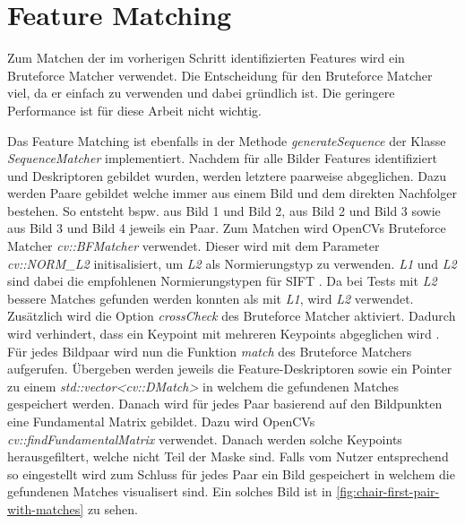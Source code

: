 \section{Feature Matching}\label{sec:implementation-feature-matching}
Zum Matchen der im vorherigen Schritt identifizierten Features wird ein Bruteforce Matcher verwendet.
Die Entscheidung für den Bruteforce Matcher viel, da er einfach zu verwenden und dabei gründlich ist.
Die geringere Performance ist für diese Arbeit nicht wichtig.

Das Feature Matching ist ebenfalls in der Methode \emph{generateSequence} der Klasse \emph{SequenceMatcher} implementiert.
Nachdem für alle Bilder Features identifiziert und Deskriptoren gebildet wurden, werden letztere paarweise abgeglichen.
Dazu werden Paare gebildet welche immer aus einem Bild und dem direkten Nachfolger bestehen.
So entsteht bspw. aus Bild 1 und Bild 2, aus Bild 2 und Bild 3 sowie aus Bild 3 und Bild 4 jeweils ein Paar.
Zum Matchen wird OpenCVs Bruteforce Matcher \emph{cv::BFMatcher}\cite{opencv_doc_bfmatcher} verwendet.
Dieser wird mit dem Parameter \emph{cv::NORM\_L2} initisalisiert, um \emph{L2} als Normierungstyp zu verwenden.
\emph{L1} und \emph{L2} sind dabei die empfohlenen Normierungstypen für SIFT \cite{opencv_doc_bfmatcher_create}.
Da bei Tests mit \emph{L2} bessere Matches gefunden werden konnten als mit \emph{L1}, wird \emph{L2} verwendet.
Zusätzlich wird die Option \emph{crossCheck} des Bruteforce Matcher aktiviert.
Dadurch wird verhindert, dass ein Keypoint mit mehreren Keypoints abgeglichen wird \cite{opencv_doc_bfmatcher_create}.
Für jedes Bildpaar wird nun die Funktion \emph{match}\cite{opencv_doc_match} des Bruteforce Matchers aufgerufen.
Übergeben werden jeweils die Feature-Deskriptoren sowie ein Pointer zu einem \emph{std::vector<cv::DMatch>} in welchem die gefundenen Matches gespeichert werden.
Danach wird für jedes Paar basierend auf den Bildpunkten eine Fundamental Matrix gebildet.
Dazu wird OpenCVs \emph{cv::findFundamentalMatrix}\cite{opencv_doc_find_fundamental_mat} verwendet.
Danach werden solche Keypoints herausgefiltert, welche nicht Teil der Maske sind.
Falls vom Nutzer entsprechend so eingestellt wird zum Schluss für jedes Paar ein Bild gespeichert in welchem die gefundenen Matches visualisert sind.
Ein solches Bild ist in \autoref{fig:chair-first-pair-with-matches} zu sehen.
